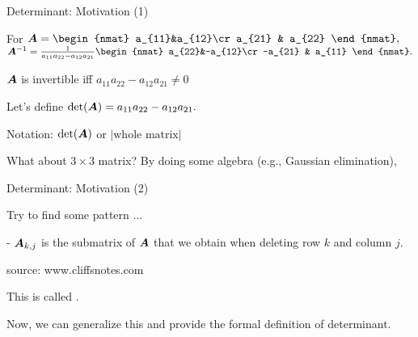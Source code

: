 \documentclass[fleqn,aspectratio=169]{beamer}
\begin{document}
\begin{frame}{Determinant: Motivation (1)}

\plitemsep 0.1in

\bci 
\item For $\mat{A} = 
\begin{nmat}
a_{11}&a_{12}\cr
a_{21} & a_{22}
\end{nmat},
$
$\inv{\mat{A}} =\frac{1}{a_{11}a_{22} - a_{12}a_{21}}
\begin{nmat}
a_{22}&-a_{12}\cr
-a_{21} & a_{11}
\end{nmat}.
$

\item $\bm{A}$ is invertible iff $a_{11}a_{22} - a_{12}a_{21} \neq 0$

\item  Let's define $\det(\bm{A}) = a_{11}a_{22} - a_{12}a_{21}.$

\item Notation: $\det(\bm{A})$ or $|\text{whole matrix}|$

\item What about $3 \times 3$ matrix? By doing some algebra (e.g., Gaussian elimination), 
\eci
\end{frame}

\begin{frame}{Determinant: Motivation (2)}

\plitemsep 0.1in

\bci 
\item Try to find some pattern ... 

{

- $\bm{A}_{k,j}$ is the submatrix of $\bm{A}$ that we obtain when deleting row $k$ and column $j.$
}
{
\centering
{}
{\scriptsize source: www.cliffsnotes.com}
}

\item This is called .

\item Now, we can generalize this and provide the formal definition of determinant. 

\eci
\end{frame}
\end{document}
